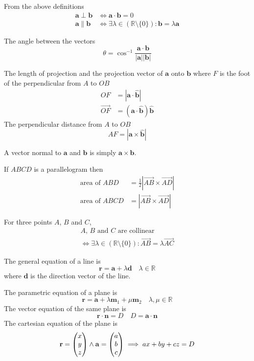 \documentclass{slnotes}
\newcommand*{\ve}[1]{\mathbf{#1}}
\newcommand*\cve[3][]{\begin{pmatrix}\ifx\relax#1\relax\else#1\\\fi#2\\#3\end{pmatrix}}
\begin{document}
From the above definitions \begin{align*}\ve a \mathrel\bot \ve b &\iff \ve a \cdot \ve b = 0\\\ve a \parallel \ve b &\iff \mathrel\exists \lambda \in (\mathbb{R} \setminus \{0\}): \ve b = \lambda\ve a\end{align*}

The angle between the vectors \[\theta = \cos^{-1}\frac{\ve a \cdot \ve b}{|\ve a||\ve b|}\]

The length of projection and the projection vector of \(\ve a\) onto \(\ve b\) where \(F\) is the foot of the perpendicular from \(A\) to \(OB\)\begin{align*}OF &= |\ve a \cdot \ve{\hat b}|\\\overrightarrow{OF} &= (\ve a \cdot \ve{\hat b})\ve{\hat b}\end{align*} The perpendicular distance from \(A\) to \(OB\) \[AF = |\ve a \times \ve{\hat b}|\]

A vector normal to \(\ve a\) and \(\ve b\) is simply \(\ve a \times \ve b\).

If \(ABCD\) is a parallelogram then \begin{align*}\text{area of }ABD &= \frac{1}{2}\left|\overrightarrow{AB} \times \overrightarrow{AD}\right|\\\text{area of }ABCD &=  \left|\overrightarrow{AB} \times \overrightarrow{AD}\right|\end{align*}

For three points \(A\), \(B\) and \(C\), {\begin{multline*}A\text{, }B\text{ and }C\text{ are collinear}\\\iff \mathrel\exists\lambda\in(\mathbb R \setminus \{0\}): \overrightarrow{AB} = \lambda\overrightarrow{AC}\end{multline*}}

The general equation of a line is \[\ve r = \ve a + \lambda\ve d\quad\lambda\in\mathbb R\] where \(\ve d\) is the direction vector of the line.

The parametric equation of a plane is \[\ve r = \ve a + \lambda\ve m_1 + \mu\ve m_2\quad\lambda,\mu\in\mathbb R\] The vector equation of the same plane is \[\ve r \cdot \ve n = D\quad D = \ve a \cdot \ve n\] The cartesian equation of the plane is \[\ve r = \cve[x]{y}{z} \wedge \ve a = \cve[a]{b}{c} \implies ax+by+cz = D\]
\end{document}
